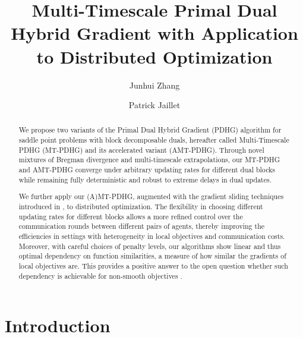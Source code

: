 \documentclass[10pt]{article}
\title{Multi-Timescale Primal Dual Hybrid Gradient with Application to Distributed Optimization}
\author[1]{Junhui Zhang}
\author[1,2]{Patrick Jaillet}
\affil[1]{Operations Research Center, MIT}
\affil[2]{Department of Electrical Engineering and Computer Science, MIT}
\date{}
\begin{document}
\maketitle
\begin{abstract}
We propose two variants of the Primal Dual Hybrid Gradient (PDHG) algorithm for saddle point problems with block decomposable duals, hereafter called Multi-Timescale PDHG (MT-PDHG) and its accelerated variant (AMT-PDHG). Through novel mixtures of Bregman divergence and multi-timescale extrapolations, our MT-PDHG and AMT-PDHG converge under arbitrary updating rates for different dual blocks while remaining fully deterministic and robust to extreme delays in dual updates. 

We further apply our (A)MT-PDHG, augmented with the gradient sliding techniques introduced in \cite{lan_communication-efficient_2020,lan_gradient_2016}, to distributed optimization. The flexibility in choosing different updating rates for different blocks allows a more refined control over the communication rounds between different pairs of agents, thereby improving the efficiencies in settings with heterogeneity in local objectives and communication costs. Moreover, with careful choices of penalty levels, our algorithms show linear and thus optimal dependency on function similarities, a measure of how similar the gradients of local objectives are. This provides a positive answer to the open question whether such dependency is achievable for non-smooth objectives \cite{ArjevaniShamir2015Communication}.
\end{abstract}
\section{Introduction}
\end{document}
